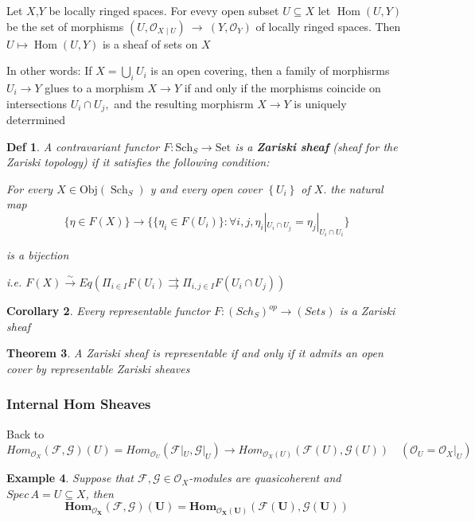 \documentclass{article}
\newtheorem{theorem}{Theorem}[section]
\newtheorem{definition}[theorem]{Def}
\newtheorem{corollary}[theorem]{Corollary}
\newtheorem{example}[theorem]{Example}
\begin{document}
    Let $X$,$Y$ be locally ringed spaces. For evevy open subset $U\subseteq X$ let $\operatorname{Hom}(U,Y)$ be the set of morphisms $(U,{\mathcal{O}}_{X\mid U})\ \to\ (Y,{\mathcal{O}}_{Y})$ of locally ringed spaces. Then $U\mapsto\operatorname{Hom}(U,Y)$ is a sheaf of sets on $X$ 

In other words: If $X=\bigcup_{i}U_{i}$ is an open covering, then a family of morphisrms $U_{i}\to Y$ glues to a morphism $X\to Y$ if and only if the morphisms coincide on intersections $U_{i}\cap U_{j},$ and the resulting morphisrm $X\to Y$ is uniquely deterrmined


\begin{definition}
A contravariant functor $F:\mathrm{Sch}_{S}\rightarrow\mathrm{Set}$ is a \textbf{Zariski sheaf} (sheaf for the
Zariski topology) if it satisfies the following condition:
    
For every $X\in{\mathrm{Obj}}(\operatorname{Sch}_{S})$ y and every open cover $\left\{U_{i}\right\}$ of $X.$ the natural map
$$
\{\eta\in F(X)\}\to\{\{\eta_{i}\in F(U_{i})\}:\forall i,j,\eta_{i}|_{U_{i}\cap U_{j}}=\eta_{j}|_{U_{i}\cap U_{i}}\} 
$$

is a bijection

i.e. $F(X)\xrightarrow{\sim}Eq(\Pi_{i\in I}F(U_i)\rightrightarrows \Pi_{i,j\in I}F(U_i\cap U_j))$
\end{definition}

\begin{corollary}
Every representable functor $F : (Sch_S)
^{op} \to (Sets)$ is a Zariski sheaf 
\end{corollary}

\begin{theorem}
    A Zariski sheaf is representable if and only if it admits an open cover by representable Zariski sheaves
\end{theorem}

\subsubsection{Internal Hom Sheaves}
Back to ${Hom}_{\mathcal O_X}(\mathcal F,\mathcal G)(U)
={Hom}_{\mathcal O_U}(\mathcal F|_U,\mathcal G|_U)
\to {Hom}_{\mathcal O_X(U)}(\mathcal F(U),\mathcal G(U))
\quad (\mathcal O_U=\mathcal O_X|_U)$

\begin{example}
    Suppose that $\mathcal F,\mathcal G\in \mathcal O_X$-modules are quasicoherent and $Spec\,A=U\subseteq X$, then 
    $$
    \bm{{Hom}_{\mathcal O_X}(\mathcal F,\mathcal G)(U)
    = {Hom}_{\mathcal O_X(U)}(\mathcal F(U),\mathcal G(U))} 
    $$
\end{example}
\end{document}
